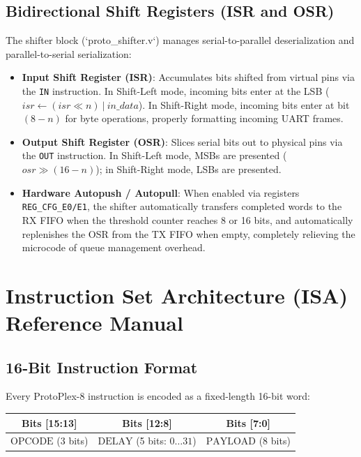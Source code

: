 \documentclass[11pt,a4paper]{article}
\begin{document}
\subsection{Bidirectional Shift Registers (ISR and OSR)}
The shifter block (`proto\_shifter.v`) manages serial-to-parallel deserialization and parallel-to-serial serialization:
\begin{itemize}
    \item \textbf{Input Shift Register (ISR)}: Accumulates bits shifted from virtual pins via the \texttt{IN} instruction. In Shift-Left mode, incoming bits enter at the LSB ($isr \leftarrow (isr \ll n) \ | \ in\_data$). In Shift-Right mode, incoming bits enter at bit $(8-n)$ for byte operations, properly formatting incoming UART frames.
    \item \textbf{Output Shift Register (OSR)}: Slices serial bits out to physical pins via the \texttt{OUT} instruction. In Shift-Left mode, MSBs are presented ($osr \gg (16 - n)$); in Shift-Right mode, LSBs are presented.
    \item \textbf{Hardware Autopush / Autopull}: When enabled via registers \texttt{REG\_CFG\_E0/E1}, the shifter automatically transfers completed words to the RX FIFO when the threshold counter reaches 8 or 16 bits, and automatically replenishes the OSR from the TX FIFO when empty, completely relieving the microcode of queue management overhead.
\end{itemize}

\section{Instruction Set Architecture (ISA) Reference Manual}

\subsection{16-Bit Instruction Format}
Every ProtoPlex-8 instruction is encoded as a fixed-length 16-bit word:
\begin{center}
\begin{tabular}{|c|c|c|}
\hline
\textbf{Bits [15:13]} & \textbf{Bits [12:8]} & \textbf{Bits [7:0]} \\
\hline
$\text{OPCODE}$ (3 bits) & $\text{DELAY}$ (5 bits: $0 \dots 31$) & $\text{PAYLOAD}$ (8 bits) \\
\hline
\end{tabular}
\end{center}
\end{document}

